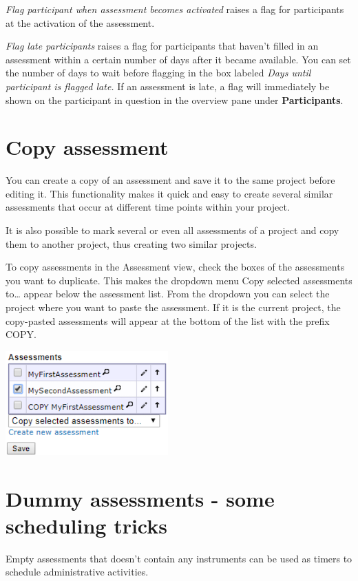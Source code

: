\documentclass[
]{book}
\begin{document}
\emph{Flag participant when assessment becomes activated} raises a flag for participants at the activation of the assessment.

\emph{Flag late participants} raises a flag for participants that haven't filled in an assessment within a certain number of days after it became available. You can set the number of days to wait before flagging in the box labeled \emph{Days until participant is flagged late.} If an assessment is late, a flag will immediately be shown on the participant in question in the overview pane under \textbf{Participants}.

\section{Copy assessment}\label{copy-assessment}

You can create a copy of an assessment and save it to the same project before editing it. This functionality makes it quick and easy to create several similar assessments that occur at different time points within your project.

It is also possible to mark several or even all assessments of a project and copy them to another project, thus creating two similar projects.

To copy assessments in the Assessment view, check the boxes of the assessments you want to duplicate. This makes the dropdown menu Copy selected assessments to\ldots{} appear below the assessment list. From the dropdown you can select the project where you want to paste the assessment. If it is the current project, the copy-pasted assessments will appear at the bottom of the list with the prefix COPY.

\includegraphics{images/copy-assessment.png}

\section{Dummy assessments - some scheduling tricks}\label{dummy-assessments---some-scheduling-tricks}

Empty assessments that doesn't contain any instruments can be used as timers to schedule administrative activities.
\end{document}
